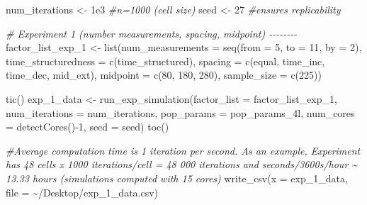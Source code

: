 \documentclass[
12pt, %
twoside,
english]{guelphthesis}
\newenvironment{Shaded}{\begin{snugshade}}{\end{snugshade}}
\newcommand{\AttributeTok}[1]{\textcolor[rgb]{0.77,0.63,0.00}{#1}}
\newcommand{\CommentTok}[1]{\textcolor[rgb]{0.56,0.35,0.01}{\textit{#1}}}
\newcommand{\DecValTok}[1]{\textcolor[rgb]{0.00,0.00,0.81}{#1}}
\newcommand{\FloatTok}[1]{\textcolor[rgb]{0.00,0.00,0.81}{#1}}
\newcommand{\FunctionTok}[1]{\textcolor[rgb]{0.00,0.00,0.00}{#1}}
\newcommand{\NormalTok}[1]{#1}
\newcommand{\OtherTok}[1]{\textcolor[rgb]{0.56,0.35,0.01}{#1}}
\newcommand{\SpecialCharTok}[1]{\textcolor[rgb]{0.00,0.00,0.00}{#1}}
\newcommand{\StringTok}[1]{\textcolor[rgb]{0.31,0.60,0.02}{#1}}
\begin{document}
\begin{Shaded}
\begin{Highlighting}[numbers=left,,]
\NormalTok{num\_iterations }\OtherTok{\textless{}{-}} \FloatTok{1e3} \CommentTok{\#n=1000 (cell size)}
\NormalTok{seed }\OtherTok{\textless{}{-}} \DecValTok{27} \CommentTok{\#ensures replicability }

\CommentTok{\# Experiment 1 (number measurements,  spacing, midpoint) {-}{-}{-}{-}{-}{-}{-}{-}}
\NormalTok{factor\_list\_exp\_1 }\OtherTok{\textless{}{-}} \FunctionTok{list}\NormalTok{(}\StringTok{\textquotesingle{}num\_measurements\textquotesingle{}} \OtherTok{=} \FunctionTok{seq}\NormalTok{(}\AttributeTok{from =} \DecValTok{5}\NormalTok{, }\AttributeTok{to =} \DecValTok{11}\NormalTok{, }\AttributeTok{by =} \DecValTok{2}\NormalTok{), }
                          \StringTok{\textquotesingle{}time\_structuredness\textquotesingle{}} \OtherTok{=} \FunctionTok{c}\NormalTok{(}\StringTok{\textquotesingle{}time\_structured\textquotesingle{}}\NormalTok{),}
                          \StringTok{\textquotesingle{}spacing\textquotesingle{}} \OtherTok{=} \FunctionTok{c}\NormalTok{(}\StringTok{\textquotesingle{}equal\textquotesingle{}}\NormalTok{, }\StringTok{\textquotesingle{}time\_inc\textquotesingle{}}\NormalTok{, }\StringTok{\textquotesingle{}time\_dec\textquotesingle{}}\NormalTok{, }\StringTok{\textquotesingle{}mid\_ext\textquotesingle{}}\NormalTok{), }
                          \StringTok{\textquotesingle{}midpoint\textquotesingle{}} \OtherTok{=} \FunctionTok{c}\NormalTok{(}\DecValTok{80}\NormalTok{, }\DecValTok{180}\NormalTok{, }\DecValTok{280}\NormalTok{),  }
                          \StringTok{\textquotesingle{}sample\_size\textquotesingle{}} \OtherTok{=} \FunctionTok{c}\NormalTok{(}\DecValTok{225}\NormalTok{))}

\FunctionTok{tic}\NormalTok{()}
\NormalTok{exp\_1\_data }\OtherTok{\textless{}{-}} \FunctionTok{run\_exp\_simulation}\NormalTok{(}\AttributeTok{factor\_list =}\NormalTok{ factor\_list\_exp\_1, }\AttributeTok{num\_iterations =}\NormalTok{ num\_iterations, }\AttributeTok{pop\_params =}\NormalTok{ pop\_params\_4l, }
                                 \AttributeTok{num\_cores =} \FunctionTok{detectCores}\NormalTok{()}\SpecialCharTok{{-}}\DecValTok{1}\NormalTok{, }\AttributeTok{seed =}\NormalTok{ seed)}
\FunctionTok{toc}\NormalTok{()}

\CommentTok{\#Average computation time is 1 iteration per second. As an example, Experiment has 48 cells x 1000 iterations/cell = 48 000 iterations and seconds/3600s/hour \textasciitilde{} 13.33 hours (simulations computed with 15 cores)}
\FunctionTok{write\_csv}\NormalTok{(}\AttributeTok{x =}\NormalTok{ exp\_1\_data, }\AttributeTok{file =} \StringTok{\textquotesingle{}\textasciitilde{}/Desktop/exp\_1\_data.csv\textquotesingle{}}\NormalTok{)}


\end{Highlighting}
\end{Shaded}
\end{document}

